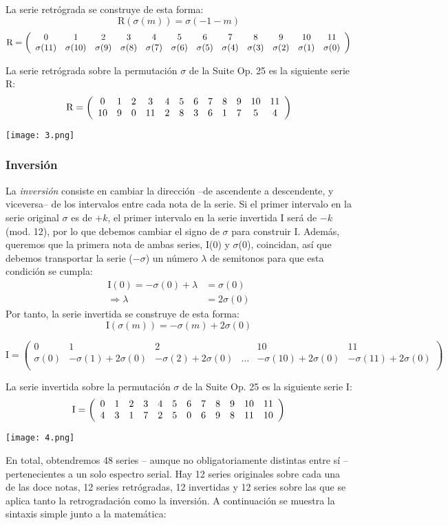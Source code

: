 		La serie retr\'ograda se construye de esta forma:
		\[\mbox{R}(\sigma(m))=\sigma(-1-m)\]
		\[{\mbox{R}=\drow{\sigma(11),\sigma(10),\sigma(9),\sigma(8),\sigma(7),\sigma(6),\sigma(5),\sigma(4),\sigma(3),\sigma(2),\sigma(1),\sigma(0)}}\]
			
		La serie retr\'ograda sobre la permutaci\'on $\sigma$ de la Suite Op. 25 es la siguiente serie R:	
		\[\mbox{R}=\drow{10,9,0,11,2,8,3,6,1,7,5,4}\]		
		\begin{center}
			\texttt{[image: 3.png]}
		\end{center}
		
	\subsubsection{Inversi\'on}
		La \emph{inversi\'on} consiste en cambiar la direcci\'on --de ascendente a descendente, y viceversa-- de los intervalos entre cada nota de la serie. Si el primer intervalo en la serie original $\sigma$ es de $+k$, el primer intervalo en la serie invertida I ser\'a de $-k$ (mod. 12), por lo que debemos cambiar el signo de $\sigma$ para construir I. Adem\'as, queremos que la primera nota de ambas series, I(0) y $\sigma$(0), coincidan, as\'i que debemos transportar la serie ($-\sigma$) un n\'umero $\lambda$ de semitonos para que esta condici\'on se cumpla:
		\begin{align*}
		\mbox{I}(0)=-\sigma(0)+\lambda&=\sigma(0)\\
		\Longrightarrow \lambda&=2\sigma(0)
		\end{align*}
		Por tanto, la serie invertida se construye de esta forma:
		\[\mbox{I}(\sigma(m))=-\sigma(m)+2\sigma(0)\]
		
		\[\mbox{I}=\left(\begin{matrix}0&1&2&&10&11\\\sigma(0)&-\sigma(1)+2\sigma(0)&-\sigma(2)+2\sigma(0)&\ldots&-\sigma(10)+2\sigma(0)&-\sigma(11)+2\sigma(0)\\\end{matrix}\right)\]
		
		La serie invertida sobre la permutaci\'on $\sigma$ de la Suite Op. 25 es la siguiente serie I:
		\[\mbox{I}=\drow{4,3,1,7,2,5,0,6,9,8,11,10}\]		
		\begin{center}
			\texttt{[image: 4.png]}
		\end{center}
				
		En total, obtendremos 48 series -- aunque no obligatoriamente distintas entre s\'i -- pertenecientes a un solo espectro serial. Hay 12 series originales sobre cada una de las doce notas, 12 series retr\'ogradas, 12 invertidas y 12 series sobre las que se aplica tanto la retrogradaci\'on como la inversi\'on. A continuaci\'on se muestra la sintaxis simple junto a la matem\'atica:
		
